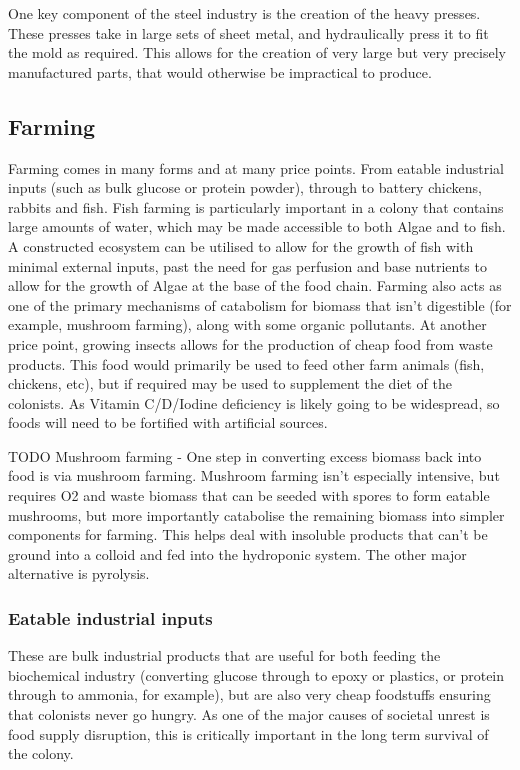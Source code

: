 \documentclass[10pt]{article}
\begin{document}
One key component of the steel industry is the creation of the heavy presses. These presses take in large sets of sheet metal, and hydraulically press it to fit the mold as required. This allows for the creation of very large but very precisely manufactured parts, that would otherwise be impractical to produce.

\subsection*{Farming}

Farming comes in many forms and at many price points. From eatable industrial inputs (such as bulk glucose or protein powder), through to battery chickens, rabbits and fish. Fish farming is particularly important in a colony that contains large amounts of water, which may be made accessible to both Algae and to fish. A constructed ecosystem can be utilised to allow for the growth of fish with minimal external inputs, past the need for gas perfusion and base nutrients to allow for the growth of Algae at the base of the food chain. Farming also acts as one of the primary mechanisms of catabolism for biomass that isn't digestible (for example, mushroom farming), along with some organic pollutants. At another price point, growing insects allows for the production of cheap food from waste products. This food would primarily be used to feed other farm animals (fish, chickens, etc), but if required may be used to supplement the diet of the colonists. As Vitamin C/D/Iodine deficiency is likely going to be widespread, so foods will need to be fortified with artificial sources.

TODO Mushroom farming - One step in converting excess biomass back into food is via mushroom farming. Mushroom farming isn't especially intensive, but requires O2 and waste biomass that can be seeded with spores to form eatable mushrooms, but more importantly catabolise the remaining biomass into simpler components for farming. This helps deal with insoluble products that can't be ground into a colloid and fed into the hydroponic system. The other major alternative is pyrolysis.


\subsubsection*{Eatable industrial inputs}

These are bulk industrial products that are useful for both feeding the biochemical industry (converting glucose through to epoxy or plastics, or protein through to ammonia, for example), but are also very cheap foodstuffs ensuring that colonists never go hungry. As one of the major causes of societal unrest is food supply disruption, this is critically important in the long term survival of the colony.
\end{document}
